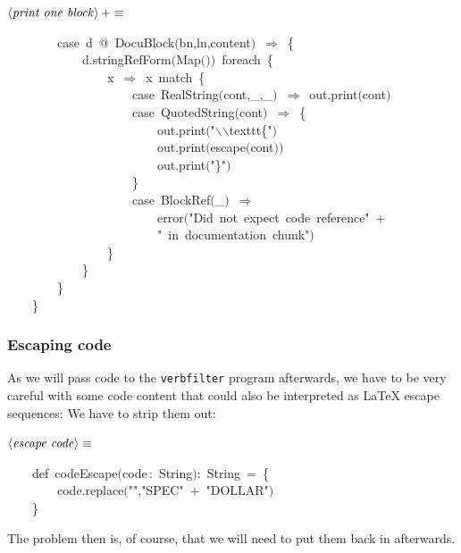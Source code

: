 \documentclass[a4paper,12pt]{article}
\begin{document}
$\left<\mbox{\emph{print one block}}\right>+\equiv$
\begin{program}~~~~~~~~{\vem case}~d~@~DocuBlock$($bn,ln,content$)$~$\Rightarrow$~{\small\{}
\\~~~~~~~~~~~~d.stringRefForm$($Map$($$)$$)$~foreach~{\small\{}
\\~~~~~~~~~~~~~~~~x~$\Rightarrow$~x~{\vem match}~{\small\{}
\\~~~~~~~~~~~~~~~~~~~~{\vem case}~RealString$($cont,\_,\_$)$~$\Rightarrow$~out.print$($cont$)$
\\~~~~~~~~~~~~~~~~~~~~{\vem case}~QuotedString$($cont$)$~$\Rightarrow$~{\small\{}
\\~~~~~~~~~~~~~~~~~~~~~~~~out.print$($"$\backslash$$\backslash$texttt{\small\{}"$)$
\\~~~~~~~~~~~~~~~~~~~~~~~~out.print$($escape$($cont$)$$)$
\\~~~~~~~~~~~~~~~~~~~~~~~~out.print$($"{\small\}}"$)$
\\~~~~~~~~~~~~~~~~~~~~{\small\}}
\\~~~~~~~~~~~~~~~~~~~~{\vem case}~BlockRef$($\_$)$~$\Rightarrow$
\\~~~~~~~~~~~~~~~~~~~~~~~~error$($"Did~not~expect~code~reference"~$+$
\\~~~~~~~~~~~~~~~~~~~~~~~~"~in~documentation~chunk"$)$
\\~~~~~~~~~~~~~~~~{\small\}}
\\~~~~~~~~~~~~{\small\}}
\\~~~~~~~~{\small\}}
\\~~~~{\small\}}
\\[0.5em]\end{program}
\subsubsection{Escaping code}
As we will pass code to the \texttt{verbfilter} program afterwards, we have to 
be very careful with some code content that could also be interpreted as
LaTeX escape sequences: We have to strip them out:

$\left<\mbox{\emph{escape code}}\right>\equiv$
\begin{program}~~~~{\vem def}~codeEscape$($code\,{\rm :}~String$)${\rm :}~String~=~{\small\{}
\\~~~~~~~~code.replace$($"\Dollar","SPEC"~$+$~"DOLLAR"$)$
\\~~~~{\small\}}
\\[0.5em]\end{program}
The problem then is, of course, that we will need to put them back in
afterwards.
\end{document}
